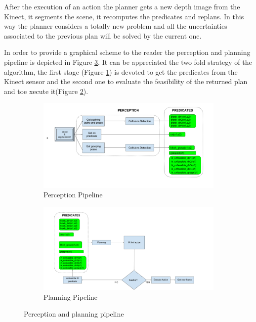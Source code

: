 After the execution of an action the planner gets a new depth image from the Kinect, it segments the scene, it recomputes the predicates and replans. In this way the planner considers a totally new problem and all the uncertainties associated to the previous plan will be solved by the current one. 

In order to provide a graphical scheme to the reader the perception and planning pipeline is depicted in Figure \ref{fig:pipeline}. It can be appreciated the two fold strategy of the algorithm, the first stage (Figure \ref{fig:pipeline1}) is devoted to get the predicates from the Kinect sensor and the second one to evaluate the feasibility of the returned plan and toe xecute it(Figure \ref{fig:pipeline2}).

\begin{figure}[t]
\centering
\begin{subfigure}[t]{\textwidth}
\centering
\includegraphics[width=\textwidth]{Img/planning/Pipeline1.png}
\caption{Perception Pipeline}\label{fig:pipeline1}
\end{subfigure}
\begin{subfigure}[t]{\textwidth}
\centering
\includegraphics[width=\textwidth]{Img/planning/Pipeline2.png}
\caption{Planning Pipeline}\label{fig:pipeline2}
\end{subfigure}
\caption{Perception and planning pipeline}\label{fig:pipeline}
\end{figure}

